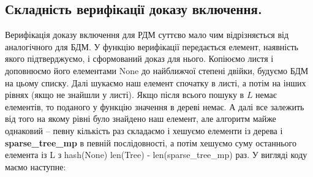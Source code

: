 \documentclass[a4paper, 12pt]{article}
\begin{document}
\subsection{Складність верифікації доказу включення.}

\par Верифікація доказу включення для РДМ суттєво мало чим відрізняється від аналогічного для БДМ. У функцію верифікації передається елемент, наявність якого підтверджуємо, і сформований доказ для нього. Копіюємо листя і доповнюємо його елементами None до найближчої степені двійки, будуємо БДМ на цьому списку. Далі шукаємо наш елемент спочатку в листі, а потім на інших рівнях (якщо не знайшли у листі). Якщо після всього пошуку в $L$ немає елементів, то поданого у функцію значення в дереві немає. А далі все залежить від того на якому рівні було знайдено наш елемент, але алгоритм майже однаковий -- певну кількість раз складаємо і хешуємо елементи із дерева і \textbf{sparse\_tree\_mp} в певній послідовності, а потім хешуємо суму останнього елемента із L з hash(None) len(Tree) - len(sparse\_tree\_mp) раз. У вигляді коду маємо наступне:
\end{document}
